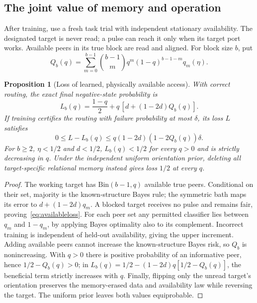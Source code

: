 \documentclass[11pt]{article}
\newtheorem{proposition}[theorem]{Proposition}
\theoremstyle{definition}
\theoremstyle{remark}
\begin{document}
\subsection{The joint value of memory and operation}

After training, use a fresh task trial with independent stationary availability. The designated target is never read; a pulse can reach it only when its target port works. Available peers in its true block are read and aligned. For block size $b$, put
\begin{equation}\label{eq:availablemajority}
 Q_b(q)=\sum_{m=0}^{b-1}\binom{b-1}{m}q^m(1-q)^{b-1-m}q_m(\eta).
\end{equation}

\begin{proposition}[Loss of learned, physically available access]
\label{prop:availableloss}
With correct routing, the exact final negative-state probability is
\begin{equation}\label{eq:availableloss}
 L_b(q)=\frac{1-q}{2}+q\,[d+(1-2d)Q_b(q)].
\end{equation}
If training certifies the routing with failure probability at most $\delta$, its loss $L$ satisfies
\[
 0\le L-L_b(q)\le
 q(1-2d)(1-2Q_b(q))\delta.
\]
For $b\ge2$, $\eta<1/2$ and $d<1/2$, $L_b(q)<1/2$ for every $q>0$ and is strictly decreasing in $q$. Under the independent uniform orientation prior, deleting all target-specific relational memory instead gives loss $1/2$ at every $q$.
\end{proposition}
\begin{proof}
The working target has $\mathrm{Bin}(b-1,q)$ available true peers. Conditional on their set, majority is the known-structure Bayes rule; the symmetric bath maps its error to $d+(1-2d)q_m$. A blocked target receives no pulse and remains fair, proving~\eqref{eq:availableloss}. For each peer set any permitted classifier lies between $q_m$ and $1-q_m$, by applying Bayes optimality also to its complement. Incorrect training is independent of held-out availability, giving the upper increment. Adding available peers cannot increase the known-structure Bayes risk, so $Q_b$ is nonincreasing. With $q>0$ there is positive probability of an informative peer, hence $1/2-Q_b(q)>0$; in $L_b(q)=1/2-(1-2d)q[1/2-Q_b(q)]$, the beneficial term strictly increases with $q$. Finally, flipping only the unread target's orientation preserves the memory-erased data and availability law while reversing the target. The uniform prior leaves both values equiprobable.
\end{proof}
\end{document}
